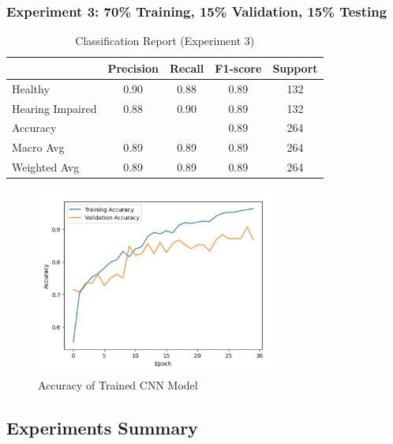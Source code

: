 \documentclass{article}
\begin{document}
\subsubsection{Experiment 3: 70\% Training, 15\% Validation, 15\% Testing}
\begin{table}[H]
  \centering
  \caption{Classification Report (Experiment 3)}
  \label{tab:classification_report_3}
  \begin{tabular}{lcccc}
    \hline
    & Precision & Recall & F1-score & Support \\
    \hline
    Healthy & 0.90 & 0.88 & 0.89 & 132 \\
    Hearing Impaired & 0.88 & 0.90 & 0.89 & 132 \\
    \hline
    Accuracy & & & 0.89 & 264 \\
    Macro Avg & 0.89 & 0.89 & 0.89 & 264 \\
    Weighted Avg & 0.89 & 0.89 & 0.89 & 264 \\
    \hline
  \end{tabular}
\end{table}

\begin{figure}[H]
  \centering
  \includegraphics[width=0.7\textwidth]{701515.png} %
  \caption{Accuracy of Trained CNN Model}
  \label{fig:accuracy_cnn}
\end{figure}

\subsection{Experiments Summary}
\end{document}
